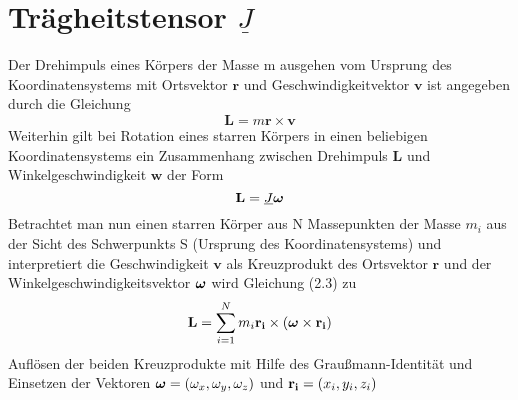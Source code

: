 

\section{Trägheitstensor $\underline{J}$}
\label{sec: Traegheitstensor}

Der Drehimpuls eines Körpers der Masse m ausgehen vom Ursprung des Koordinatensystems mit Ortsvektor $\mathbf{r}$ und Geschwindigkeitvektor
$\mathbf{v}$ ist angegeben durch die Gleichung
\begin{equation}
    \mathbf{L}=m\mathbf{r}\times\mathbf{v}
\end{equation}
Weiterhin gilt bei Rotation eines starren Körpers in einen beliebigen Koordinatensystems ein Zusammenhang zwischen Drehimpuls $\mathbf{L}$
und Winkelgeschwindigkeit $\mathbf{w}$ der Form
\begin{equation}
    \mathbf{L}=\underline{J}\vect{\omega}
\end{equation}
Betrachtet man nun einen starren Körper aus N Massepunkten der Masse $m_i$ aus der Sicht des Schwerpunkts S (Ursprung des Koordinatensystems) 
und interpretiert die Geschwindigkeit $\mathbf{v}$ als Kreuzprodukt des Ortsvektor $\mathbf{r}$ und der Winkelgeschwindigkeitsvektor $\vect{\omega}$ 
wird Gleichung (2.3) zu
\begin{gather}
    \vect{L}=\sum_{i=1}^{N} m_i\vect{r_i}\times(\vect{\omega}\times\vect{r_i})
\end{gather}
Auflösen der beiden Kreuzprodukte mit Hilfe des Graußmann-Identität und Einsetzen der Vektoren $\vect{\omega}=(\omega_x,\omega_y, \omega_z)$
und $\vect{r_i}=(x_i, y_i, z_i)$ 
